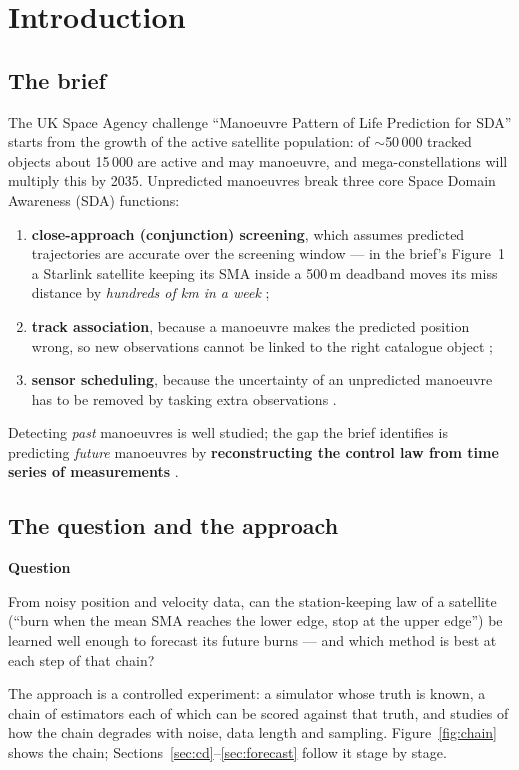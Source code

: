\documentclass[11pt,a4paper]{article}
\newenvironment{keybox}[1]%
  {\par\medskip\noindent\begin{lrbox}{\briefbox}\begin{minipage}{0.96\textwidth}\textbf{#1}\par\smallskip}%
  {\end{minipage}\end{lrbox}\fcolorbox{blue!40!black}{blue!4}{\usebox{\briefbox}}\par\medskip}
\begin{document}
\section{Introduction}
\subsection{The brief}
The UK Space Agency challenge ``Manoeuvre Pattern of Life Prediction for SDA'' \cite{uksa} starts from the
growth of the active satellite population: of $\sim$50\,000 tracked objects about 15\,000 are active and may
manoeuvre, and mega-constellations will multiply this by 2035. Unpredicted manoeuvres break three core Space
Domain Awareness (SDA) functions:
\begin{enumerate}
  \item \textbf{close-approach (conjunction) screening}, which assumes predicted trajectories are accurate over
        the screening window --- in the brief's Figure~1 a Starlink satellite keeping its SMA inside a 500\,m
        deadband moves its miss distance by \emph{hundreds of km in a week} \cite{vallado2025};
  \item \textbf{track association}, because a manoeuvre makes the predicted position wrong, so new observations
        cannot be linked to the right catalogue object \cite{barshalom};
  \item \textbf{sensor scheduling}, because the uncertainty of an unpredicted manoeuvre has to be removed by
        tasking extra observations \cite{marsillach}.
\end{enumerate}
Detecting \emph{past} manoeuvres is well studied; the gap the brief identifies is predicting \emph{future}
manoeuvres by \textbf{reconstructing the control law from time series of measurements} \cite{leuridan}.

\subsection{The question and the approach}
\begin{keybox}{Question}
From noisy position and velocity data, can the station-keeping law of a satellite (``burn when the mean SMA
reaches the lower edge, stop at the upper edge'') be learned well enough to forecast its future burns --- and
which method is best at each step of that chain?
\end{keybox}
The approach is a controlled experiment: a simulator whose truth is known, a chain of estimators each of which
can be scored against that truth, and studies of how the chain degrades with noise, data length and sampling.
Figure~\ref{fig:chain} shows the chain; Sections~\ref{sec:cd}--\ref{sec:forecast} follow it stage by stage.
\end{document}
